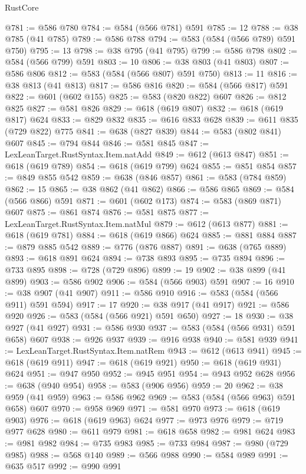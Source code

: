 \begin{lexlean}{RustCore}
\begin{coremodule}
@781 := @586 @780
@784 := @584 (@566 @781) @591
@785 := 12
@788 := @38 @785 (@41 @785)
@789 := @586 @788
@794 := @583 (@584 (@566 @789) @591 @750)
@795 := 13
@798 := @38 @795 (@41 @795)
@799 := @586 @798
@802 := @584 (@566 @799) @591
@803 := 10
@806 := @38 @803 (@41 @803)
@807 := @586 @806
@812 := @583 (@584 (@566 @807) @591 @750)
@813 := 11
@816 := @38 @813 (@41 @813)
@817 := @586 @816
@820 := @584 (@566 @817) @591
@822 := @601 (@602 @155)
@825 := @583 (@820 @822) @607
@826 := @812 @825
@827 := @581 @826
@829 := @618 (@619 @807)
@832 := @618 (@619 @817) @624
@833 := @829 @832
@835 := @616 @833 @628
@839 := @611 @835 (@729 @822) @775
@841 := @638 (@827 @839)
@844 := @583 (@802 @841) @607
@845 := @794 @844
@846 := @581 @845
@847 := LexLeanTarget.RustSyntax.Item.natAdd
@849 := @612 (@613 @847)
@851 := @618 (@619 @789)
@854 := @618 (@619 @799) @624
@855 := @851 @854
@857 := @849 @855 @542
@859 := @638 (@846 @857)
@861 := @583 (@784 @859)
@862 := 15
@865 := @38 @862 (@41 @862)
@866 := @586 @865
@869 := @584 (@566 @866) @591
@871 := @601 (@602 @173)
@874 := @583 (@869 @871) @607
@875 := @861 @874
@876 := @581 @875
@877 := LexLeanTarget.RustSyntax.Item.natMul
@879 := @612 (@613 @877)
@881 := @618 (@619 @781)
@884 := @618 (@619 @866) @624
@885 := @881 @884
@887 := @879 @885 @542
@889 := @776 (@876 @887)
@891 := @638 (@765 @889)
@893 := @618 @891 @624
@894 := @738 @893
@895 := @735 @894
@896 := @733 @895
@898 := @728 (@729 @896)
@899 := 19
@902 := @38 @899 (@41 @899)
@903 := @586 @902
@906 := @584 (@566 @903) @591
@907 := 16
@910 := @38 @907 (@41 @907)
@911 := @586 @910
@916 := @583 (@584 (@566 @911) @591 @594)
@917 := 17
@920 := @38 @917 (@41 @917)
@921 := @586 @920
@926 := @583 (@584 (@566 @921) @591 @650)
@927 := 18
@930 := @38 @927 (@41 @927)
@931 := @586 @930
@937 := @583 (@584 (@566 @931) @591 @658) @607
@938 := @926 @937
@939 := @916 @938
@940 := @581 @939
@941 := LexLeanTarget.RustSyntax.Item.natRem
@943 := @612 (@613 @941)
@945 := @618 (@619 @911)
@947 := @618 (@619 @921)
@950 := @618 (@619 @931) @624
@951 := @947 @950
@952 := @945 @951
@954 := @943 @952 @628
@956 := @638 (@940 @954)
@958 := @583 (@906 @956)
@959 := 20
@962 := @38 @959 (@41 @959)
@963 := @586 @962
@969 := @583 (@584 (@566 @963) @591 @658) @607
@970 := @958 @969
@971 := @581 @970
@973 := @618 (@619 @903)
@976 := @618 (@619 @963) @624
@977 := @973 @976
@979 := @719 @977 @628
@980 := @611 @979
@981 := @618 @658
@982 := @981 @624
@983 := @981 @982
@984 := @735 @983
@985 := @733 @984
@987 := @980 (@729 @985)
@988 := @568 @140
@989 := @566 @988
@990 := @584 @989
@991 := @635 @517
@992 := @990 @991

\end{coremodule}
\end{lexlean}
